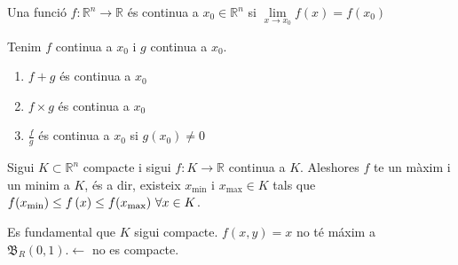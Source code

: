 \documentclass[../main.tex]{subfiles}
\begin{document}
    \begin{definicio}
        Una funció $f: \mathbb{R}^n \rightarrow \mathbb{R}$ és continua a $x_0 \in \mathbb{R}^n$ si $\lim\limits_{x \rightarrow x_0} f\left( x \right) = f\left( x_0 \right)$
    \end{definicio}
    \begin{corolari}
        Tenim $f$ continua a $x_0$ i $g$ continua a $x_0$.
        \begin{enumerate}
            \item $f+g$ és continua a $x_0$
            \item $f\times g$ és continua a $x_0$
            \item $\frac{f}{g}$ és continua a $x_0$ si $g\left( x_0 \right) \neq 0$
        \end{enumerate}
    \end{corolari}
    \begin{teorema}
        Sigui $K \subset \mathbb{R}^n$ compacte i sigui $f: K \rightarrow \mathbb{R}$ continua a $K$.
        Aleshores $f$ te un màxim i un minim a $K$, és a dir, existeix $x_\text{min}$ i $x_\text{max} \in K$
        tals que $f(x_\text{min}) \leq f\left( x \right) \leq f(x_\text{max}) \hbox{ } \forall x \in K$.
    \end{teorema}
    \begin{obs}
        Es fundamental que $K$ sigui compacte. $f\left( x,y \right) = x$ no té máxim a $\mathfrak{B}_R\left( 0,1 \right). \leftarrow$ no
        es compacte.
    \end{obs}
\end{document}
